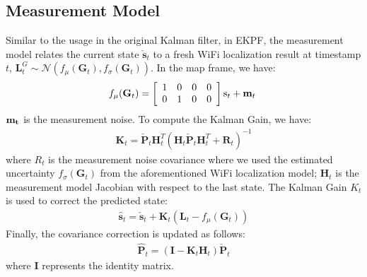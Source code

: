 \subsection{Measurement Model}

Similar to the usage in the original Kalman filter, in EKPF, the measurement model relates the current state $\mathbf{\check{s}}_t$ to a fresh WiFi localization result at timestamp $t$, $\mathbf{L}^{G}_t \sim \mathcal{N}(f_{\mu}(\mathbf{G}_t), f_{\sigma}(\mathbf{G}_t))$.
In the map frame, we have:
\begin{equation}
\begin{aligned}
 f_{\mu}(\mathbf{G}_t)=\left[\begin{array}{c c c c}{{1}}&{{0}}&{{0}}&{{0}}\\ {{0}}&{{1}}&{{0}}&{{0}}\end{array}\right]\mathrm{s}_{t}+{\bf m}_{t}\;
\end{aligned}
\end{equation}
$\bf{m}_{t}$ is the measurement noise.
To compute the Kalman Gain, we have:
\begin{equation}
\begin{aligned}
\mathbf{K}_t = \mathbf{\check{P}}_t \mathbf{H}_t^T \left(\mathbf{H}_t \mathbf{\check{P}}_t \mathbf{H}_t^T +  \mathbf{R}_t  \right)^{-1} 
\end{aligned}
\end{equation}
where $R_t$ is the measurement noise covariance where we used the estimated uncertainty $f_{\sigma}(\mathbf{G}_t)$ from the aforementioned WiFi localization model; $\mathbf{H}_t$ is the measurement model Jacobian with respect to the last state. The Kalman Gain $K_t$ is used to correct the predicted state:
\begin{equation}
\begin{aligned}
\mathbf{\hat{s}}_t = \mathbf{\check{s}}_t + \mathbf{K}_t \left(\mathbf{L}_t -  f_{\mu}(\mathbf{G}_t)\right)
\end{aligned}
\end{equation}
Finally, the covariance correction is updated as follows:
\begin{equation}
\begin{aligned}
\mathbf{\hat{P}}_t = \left(\mathbf{I} - \mathbf{K}_t \mathbf{H}_t \right)\mathbf{\check{P}}_t
\end{aligned}
\end{equation}
where $\mathbf{I}$ represents the identity matrix.


